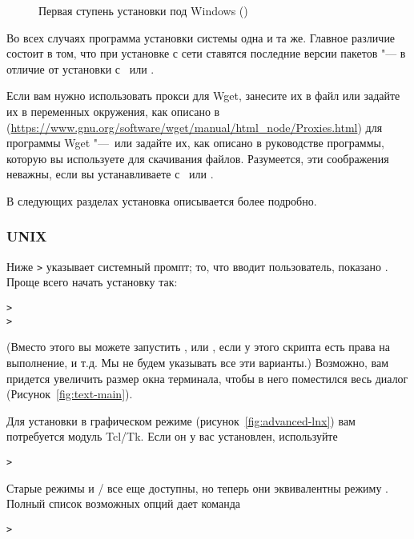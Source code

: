\documentclass{article}
\begin{document}
\begin{figure}[tb]
\caption{Первая ступень установки под Windows ()}\label{fig:nsis}
\end{figure}


Во всех случаях программа установки системы одна и та же.  Главное
различие состоит в том, что при установке с сети ставятся последние
версии пакетов "--- в отличие от установки с \DVD\ или \ISO.

Если вам нужно использовать прокси для Wget, занесите их в файл
 или задайте их в переменных окружения, как
описано в
(\url{https://www.gnu.org/software/wget/manual/html_node/Proxies.html})
для программы Wget "---~или задайте их, как описано в руководстве
программы, которую вы используете для скачивания файлов.  Разумеется,
эти соображения неважны, если вы устанавливаете с \DVD\ или \ISO.

В следующих разделах установка описывается более подробно.

\subsubsection{UNIX}

Ниже \texttt{>} указывает системный промпт;  то, что вводит
пользователь, показано .
Проще всего начать установку так:
\begin{alltt}
> 
> 
\end{alltt}
(Вместо этого вы можете запустить , или 
, если у этого скрипта есть права на выполнение, и
т.д.  Мы не будем указывать все эти варианты.)    Возможно, вам
придется увеличить размер окна терминала, чтобы в него поместился весь
диалог (Рисунок~\ref{fig:text-main}).


Для установки в графическом режиме (рисунок~\ref{fig:advanced-lnx})
вам потребуется модуль Tcl/Tk.  Если он у вас установлен, используйте
\begin{alltt}
> 
\end{alltt}

Старые режимы  и / все еще
доступны, но теперь они эквивалентны режиму .  Полный
список возможных опций дает команда
\begin{alltt}
> 
\end{alltt}
\end{document}
